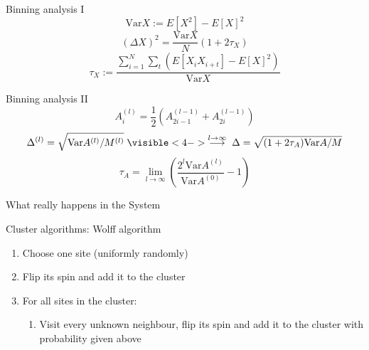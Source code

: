 \documentclass[handout]{beamer}
\begin{document}
\begin{frame}{Binning analysis I}
\pause
\[ \text{Var} X := E \left[ X^2 \right] - E \left[ X \right]^2 \]
\pause
\[ (\Delta X)^2 = \frac{\text{Var}X}{N}\left(1+2\tau_X\right) \]
\pause
\[ \tau_X := \frac{\sum\limits_{i=1}^N\sum\limits_t \left( E\left[ X_i X_{i+t} \right]-E \left [X \right] ^2 \right)}{\text{Var}X} \]
\end{frame}

\begin{frame}{Binning analysis II}
\pause
\[ A_i^{(l)} = \frac{1}{2} \left( A_{2i-1}^{(l-1)} + A_{2i}^{(l-1)} \right) \]
\pause
\[ \Delta^{(l)} = \sqrt{\text{Var}A^{(l)}/M^{(l)}}  \; \visible<4->{\stackrel{l \rightarrow \infty}{\longrightarrow} \; \Delta = \sqrt{(1+2\tau_A)\text{Var}A/M}} \]
\pause[5]
\[ \tau_A = \lim_{l\rightarrow\infty}\left( \frac{2^l \text{Var} A^{(l)}}{\text{Var} A^{(0)}} - 1 \right) \]
\end{frame}

\begin{frame}{What really happens in the System}
\end{frame}

\begin{frame}{Cluster algorithms: Wolff algorithm}
\begin{enumerate}
\item<2-> Choose one site (uniformly randomly)
\item<3-> Flip its spin and add it to the cluster
\item<4-> For all sites in the cluster:
	\begin{enumerate}
	\item Visit every unknown neighbour, flip its spin and add it to the cluster with probability given above
	\end{enumerate}
\end{enumerate}
\note{ }
\end{frame}
\end{document}
